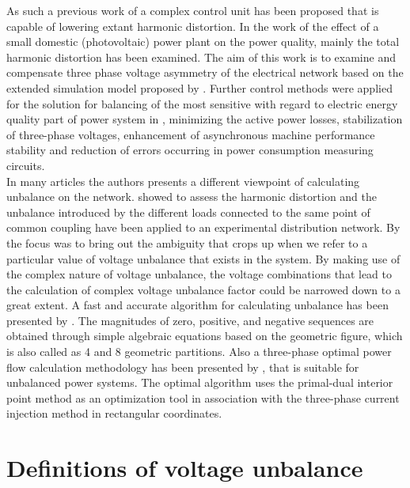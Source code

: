 As such a previous work of \cite{gorbe2012reduction} a complex control unit has been proposed that is capable of lowering extant harmonic distortion. In the work of \cite{Gorbe2014experimental} the effect of a small domestic (photovoltaic) power plant on the power quality, mainly the total harmonic distortion has been examined. The aim of this work is to examine and compensate three phase voltage asymmetry of the electrical network based on the extended simulation model proposed by \cite{gorbe2012reduction}. Further control methods were applied for the solution for balancing of the most sensitive with regard to electric energy quality part of power system in \cite{korovkin2016uimethod},  minimizing the active power losses, stabilization of three-phase voltages, enhancement of asynchronous machine performance stability and reduction of errors occurring in power consumption measuring circuits.\\
In many articles the authors presents a different viewpoint of calculating unbalance on the network. \cite{martin2015unbalance} showed to assess the harmonic distortion and the unbalance introduced by the different loads connected to the same point of common coupling have been applied to an experimental distribution network.  By \cite{kini2007novel} the focus was to bring out the ambiguity that crops up when we refer to a particular value of voltage unbalance that exists in the system. By making use of the complex nature of voltage unbalance, the voltage combinations that lead to the calculation of complex voltage unbalance factor could be narrowed down to a great extent. A fast and accurate algorithm for calculating unbalance has been presented by \cite{wen2014approximate}. The magnitudes of zero, positive, and negative sequences are obtained through simple algebraic equations based on the geometric figure, which is also called as 4 and 8 geometric partitions. Also a three-phase optimal power flow calculation methodology has been presented by \cite{araujo2013three}, that is suitable for unbalanced power systems. The optimal algorithm uses the primal-dual interior point method as an optimization tool in association with the three-phase current injection method in rectangular coordinates.\\

\section{Definitions of voltage unbalance}\label{BASICUNB:sec:DefinitionsofUNB}

